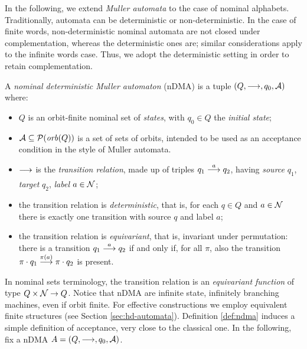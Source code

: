 
In the following, we extend \emph{Muller automata} to the case of nominal alphabets. Traditionally, automata can be deterministic or non-deterministic. In the case of finite words, non-deterministic nominal automata are not closed under complementation, whereas the deterministic ones are; similar considerations apply to the infinite words case. Thus, we adopt the deterministic setting in order to retain complementation.

\begin{definition}\label{def:ndma}
 A \emph{nominal deterministic Muller automaton} (nDMA) is a tuple $(Q,\overset{}{\longrightarrow},q_0,\mathcal{A})$ where:
 
  \begin{itemize}
  \item $Q$ is an orbit-finite nominal set of \emph{states}, with $q_0 \in Q$ the \emph{initial state};
  
  \item $\mathcal{A} \subseteq \mathcal{P}(\mathit{orb}(Q))$ is a set of sets of orbits, intended to be used as an acceptance condition in the style of Muller automata.
  
  \item $\overset{}{\underset{}{\longrightarrow}}$ is the \emph{transition relation}, made up of triples $q_1 \overset{a}{\longrightarrow} q_2$, having \emph{source} $q_1$, \emph{target} $q_2$, \emph{label} $a \in \mathcal{N}$;
  
  \item the transition relation is \emph{deterministic}, that is, for each $q \in Q$ and $a \in \mathcal{N}$ there is exactly one transition with source $q$ and label $a$;
  
  \item the transition relation is \emph{equivariant}, that is, invariant under permutation: there is a transition $q_1 \overset{a}{\longrightarrow} q_2$ if and only if, for all $\pi$, also the transition $\pi \cdot q_1 \overset{\pi(a)}{\longrightarrow} \pi \cdot q_2$ is present.
 \end{itemize}
\end{definition}
%
In nominal sets terminology, the transition relation is an \emph{equivariant function} of type $Q \times \mathcal{N} \to Q$.  Notice that nDMA are infinite state, infinitely branching machines, even if orbit finite. For effective constructions we employ equivalent finite structures (see Section \ref{sec:hd-automata}). Definition \ref{def:ndma} induces a simple definition of acceptance, very close to the classical one. In the following, fix a nDMA $A=(Q,\overset{}{\longrightarrow},q_0,\mathcal{A})$.

